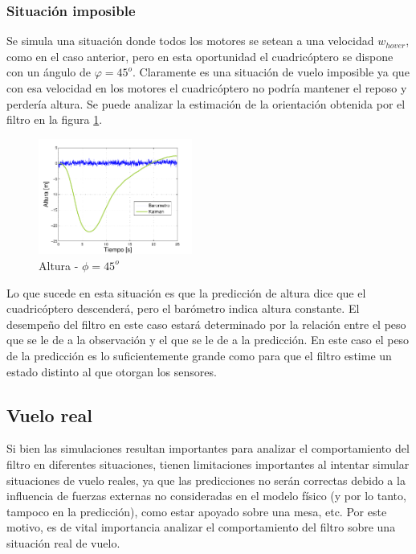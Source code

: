 \documentclass[main]{subfiles}
\begin{document}
\subsubsection{Situación imposible}

Se simula una situación donde todos los motores se setean a una velocidad $w_{hover}$, como en el caso anterior, pero en esta oportunidad el cuadricóptero se dispone con un ángulo de $\varphi = 45^o$. Claramente es una situación de vuelo imposible ya que con esa velocidad en los motores el cuadricóptero no podría mantener el reposo y perdería altura. Se puede analizar la estimación de la orientación obtenida por el filtro en la figura \ref{fig:45}.

\begin{figure}
	\begin{center}	
	\vspace{-20pt}
	\includegraphics[width=0.45\textwidth]
		{./pics_kalman/altura_inclinado_45.pdf}
	\end{center}
	\caption{Altura - $\phi = 45^o$}
	\vspace{-20pt}
	\label{fig:45}
\end{figure}

Lo que sucede en esta situación es que la predicción de altura dice que el cuadricóptero descenderá, pero el barómetro indica altura constante. El desempeño del filtro en este caso estará determinado por la relación entre el peso que se le de a la observación y el que se le de a la predicción. En este caso el peso de la predicción es lo suficientemente grande como para que el filtro estime un estado distinto al que otorgan los sensores.

\subsection{Vuelo real}

Si bien las simulaciones resultan importantes para analizar el comportamiento del filtro en diferentes situaciones, tienen limitaciones importantes al intentar simular situaciones de vuelo reales, ya que las predicciones no serán correctas debido a la influencia de fuerzas externas no consideradas en el modelo físico (y por lo tanto, tampoco en la predicción), como estar apoyado sobre una mesa, etc. Por este motivo, es de vital importancia analizar el comportamiento del filtro sobre una situación real de vuelo.\\
\end{document}
